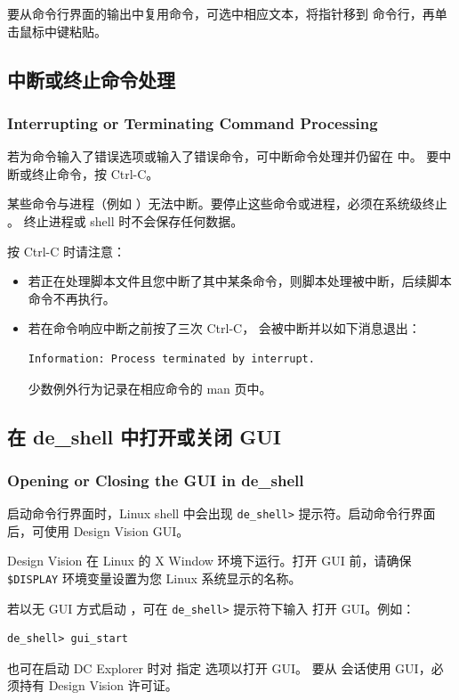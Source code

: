 要从命令行界面的输出中复用命令，可选中相应文本，将指针移到  命令行，再单击鼠标中键粘贴。

\subsection{中断或终止命令处理}
\subsubsection*{Interrupting or Terminating Command Processing}

若为命令输入了错误选项或输入了错误命令，可中断命令处理并仍留在  中。
要中断或终止命令，按 Ctrl-C。

某些命令与进程（例如 ）无法中断。要停止这些命令或进程，必须在系统级终止 。
终止进程或 shell 时不会保存任何数据。

按 Ctrl-C 时请注意：
\begin{itemize}
  \item 若正在处理脚本文件且您中断了其中某条命令，则脚本处理被中断，后续脚本命令不再执行。
  \item 若在命令响应中断之前按了三次 Ctrl-C， 会被中断并以如下消息退出：
\begin{lstlisting}
Information: Process terminated by interrupt.
\end{lstlisting}
        少数例外行为记录在相应命令的 man 页中。
\end{itemize}

\subsection{在 de\_shell 中打开或关闭 GUI}
\subsubsection*{Opening or Closing the GUI in de\_shell}

启动命令行界面时，Linux shell 中会出现 \texttt{de\_shell>} 提示符。启动命令行界面后，可使用 Design Vision GUI。

Design Vision 在 Linux 的 X Window 环境下运行。打开 GUI 前，请确保 \texttt{\$DISPLAY} 环境变量设置为您 Linux 系统显示的名称。

若以无 GUI 方式启动 ，可在 \texttt{de\_shell>} 提示符下输入  打开 GUI。例如：
\begin{lstlisting}
de_shell> gui_start
\end{lstlisting}
也可在启动 DC Explorer 时对  指定  选项以打开 GUI。
要从  会话使用 GUI，必须持有 Design Vision 许可证。

